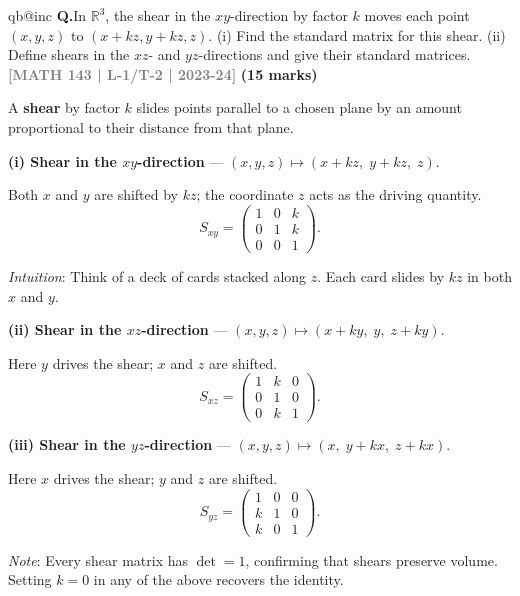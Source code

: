 \documentclass[12pt,a3paper]{article}
\makeatletter
\newcommand{\yr}[1]{\hfill\textcolor{gray}{\small\textbf{[#1]}}}
\newcommand{\mk}[1]{\textcolor{orange!70!black}{\small\textbf{(#1 marks)}}}
\newcounter{qnum}
\newcommand{\Q}[1]{%
  \csname qb@inc\endcsname
  \needspace{4\baselineskip}
  \refstepcounter{qnum}
  \vspace{6pt}
  \noindent\textbf{Q\theqnum.}\enspace #1\par
}
\makeatother
\begin{document}
\Q{In $\mathbb{R}^3$, the shear in the $xy$-direction by factor $k$ moves each point $(x,y,z)$ to $(x+kz, y+kz, z)$. (i) Find the standard matrix for this shear. (ii) Define shears in the $xz$- and $yz$-directions and give their standard matrices.
\yr{MATH 143 | L-1/T-2 | 2023-24} \mk{15}}


\begin{tcolorbox}[enhanced,breakable,
  colback=cF!4,colframe=cF,boxrule=0.8pt,arc=5pt,
  title={\textbf{Answer --- Shear Operators in $\mathbb{R}^3$}},
  fonttitle=\bfseries\color{white},colbacktitle=cF]

A \textbf{shear} by factor $k$ slides points parallel to a chosen plane by an amount proportional to their distance from that plane.

\medskip
\textbf{(i) Shear in the $xy$-direction} --- $(x,y,z)\mapsto(x+kz,\;y+kz,\;z)$.

Both $x$ and $y$ are shifted by $kz$; the coordinate $z$ acts as the driving quantity.
\[
S_{xy}=\begin{pmatrix}1&0&k\\0&1&k\\0&0&1\end{pmatrix}.
\]

\textit{Intuition}: Think of a deck of cards stacked along $z$. Each card slides by $kz$ in both $x$ and $y$.

\medskip
\textbf{(ii) Shear in the $xz$-direction} --- $(x,y,z)\mapsto(x+ky,\;y,\;z+ky)$.

Here $y$ drives the shear; $x$ and $z$ are shifted.
\[
S_{xz}=\begin{pmatrix}1&k&0\\0&1&0\\0&k&1\end{pmatrix}.
\]

\textbf{(iii) Shear in the $yz$-direction} --- $(x,y,z)\mapsto(x,\;y+kx,\;z+kx)$.

Here $x$ drives the shear; $y$ and $z$ are shifted.
\[
S_{yz}=\begin{pmatrix}1&0&0\\k&1&0\\k&0&1\end{pmatrix}.
\]

\textit{Note}: Every shear matrix has $\det=1$, confirming that shears preserve volume. Setting $k=0$ in any of the above recovers the identity.

\end{tcolorbox}
\end{document}
